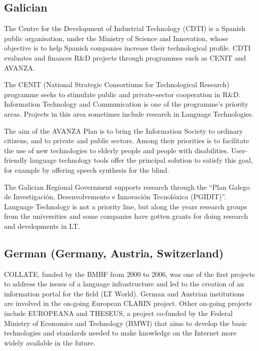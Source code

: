 \documentclass[10pt, plain]{../../metanetpaper}
\begin{document}
\begin{multicols}{2}
\begin{small}
\subsection*{Galician}
\label{sec:galician}

The Centre for the Development of Industrial Technology (CDTI) is a Spanish public organisation, under the Ministry of Science and Innovation, whose objective is to help Spanish companies increase their technological profile. CDTI evaluates and finances R\&D projects through programmes such as CENIT and AVANZA.

The CENIT (National Strategic Consortiums for Technological Research) programme seeks to stimulate public and private-sector cooperation in R\&D. Information Technology and Communication is one of the programme’s priority areas. Projects in this area sometimes include research in Language Technologies.

The aim of the AVANZA Plan is to bring the Information Society to ordinary citizens, and to private and public sectors. Among their priorities is to facilitate the use of new technologies to elderly people and people with disabilities. User-friendly language technology tools offer the principal solution to satisfy this goal, for example by offering speech synthesis for the blind.

The Galician Regional Government supports research through the “Plan Galego de Investigación, Desenvolvemento e Innovación Tecnolóxica (PGIDIT)”. Language Technology is not a priority line, but along the years research groups from the universities and some companies have gotten grants for doing research and developments in LT.

\subsection*{German (Germany, Austria, Switzerland)}
\label{sec:germ-germ-austr}

COLLATE, funded by the BMBF from 2000 to 2006, was one of the first projects to address the issues of a language infrastructure and led to the creation of an information portal for the field (LT World). German and Austrian institutions are involved in the on-going European CLARIN project. Other on-going projects include EUROPEANA and THESEUS, a project co-funded by the Federal Ministry of Economics and Technology (BMWI) that aims to develop the basic technologies and standards needed to make knowledge on the Internet more widely available in the future.


\end{small}
\end{multicols}
\end{document}
